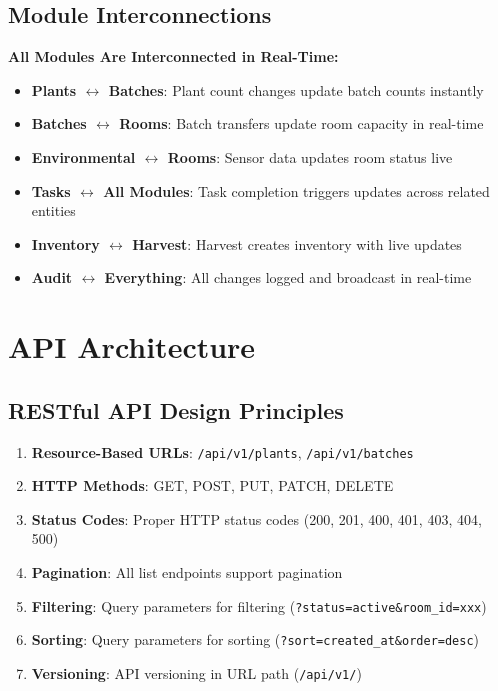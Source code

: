 \documentclass[11pt,a4paper]{article}
\begin{document}
\subsection{Module Interconnections}
\begin{realtimebox}
\textbf{All Modules Are Interconnected in Real-Time:}
\begin{itemize}
    \item \textbf{Plants $\leftrightarrow$ Batches}: Plant count changes update batch counts instantly
    \item \textbf{Batches $\leftrightarrow$ Rooms}: Batch transfers update room capacity in real-time
    \item \textbf{Environmental $\leftrightarrow$ Rooms}: Sensor data updates room status live
    \item \textbf{Tasks $\leftrightarrow$ All Modules}: Task completion triggers updates across related entities
    \item \textbf{Inventory $\leftrightarrow$ Harvest}: Harvest creates inventory with live updates
    \item \textbf{Audit $\leftrightarrow$ Everything}: All changes logged and broadcast in real-time
\end{itemize}
\end{realtimebox}

\section{API Architecture}

\subsection{RESTful API Design Principles}
\begin{enumerate}
    \item \textbf{Resource-Based URLs}: \texttt{/api/v1/plants}, \texttt{/api/v1/batches}
    \item \textbf{HTTP Methods}: GET, POST, PUT, PATCH, DELETE
    \item \textbf{Status Codes}: Proper HTTP status codes (200, 201, 400, 401, 403, 404, 500)
    \item \textbf{Pagination}: All list endpoints support pagination
    \item \textbf{Filtering}: Query parameters for filtering (\texttt{?status=active\&room\_id=xxx})
    \item \textbf{Sorting}: Query parameters for sorting (\texttt{?sort=created\_at\&order=desc})
    \item \textbf{Versioning}: API versioning in URL path (\texttt{/api/v1/})
\end{enumerate}
\end{document}
